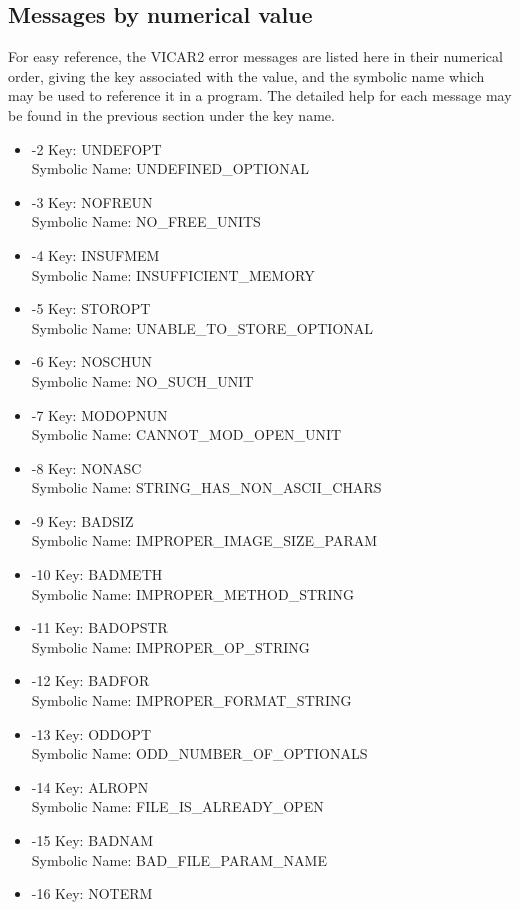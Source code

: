 \subsection{Messages by numerical value}
For easy reference, the VICAR2 error messages are listed here in
their numerical order, giving the key associated with the value, and
the symbolic name which may be used to reference it in a program.
The detailed help for each message may be found in the previous
section under the key name.
\begin{itemize}
\item -2 Key: UNDEFOPT \\
Symbolic Name: UNDEFINED\_OPTIONAL
\item -3 Key: NOFREUN \\
Symbolic Name: NO\_FREE\_UNITS
\item -4 Key: INSUFMEM \\
Symbolic Name: INSUFFICIENT\_MEMORY
\item -5 Key: STOROPT \\
Symbolic Name: UNABLE\_TO\_STORE\_OPTIONAL
\item -6 Key: NOSCHUN \\
Symbolic Name: NO\_SUCH\_UNIT
\item -7 Key: MODOPNUN \\
Symbolic Name: CANNOT\_MOD\_OPEN\_UNIT
\item -8 Key: NONASC \\
Symbolic Name: STRING\_HAS\_NON\_ASCII\_CHARS
\item -9 Key: BADSIZ \\
Symbolic Name: IMPROPER\_IMAGE\_SIZE\_PARAM
\item -10 Key: BADMETH \\
Symbolic Name: IMPROPER\_METHOD\_STRING
\item -11 Key: BADOPSTR \\
Symbolic Name: IMPROPER\_OP\_STRING
\item -12 Key: BADFOR \\
Symbolic Name: IMPROPER\_FORMAT\_STRING
\item -13 Key: ODDOPT \\
Symbolic Name: ODD\_NUMBER\_OF\_OPTIONALS
\item -14 Key: ALROPN \\
Symbolic Name: FILE\_IS\_ALREADY\_OPEN
\item -15 Key: BADNAM \\
Symbolic Name: BAD\_FILE\_PARAM\_NAME
\item -16 Key: NOTERM \\

\end{itemize}
